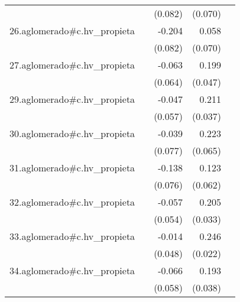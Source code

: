 {\begin{longtable}{l*{4}{D{.}{.}{-1}}}
            &                     &     (0.082)         &     (0.070)         &                     \\
\addlinespace
26.aglomerado#c.hv\_propieta&                     &      -0.204\sym{*}  &       0.058         &                     \\
            &                     &     (0.082)         &     (0.070)         &                     \\
\addlinespace
27.aglomerado#c.hv\_propieta&                     &      -0.063         &       0.199\sym{***}&                     \\
            &                     &     (0.064)         &     (0.047)         &                     \\
\addlinespace
29.aglomerado#c.hv\_propieta&                     &      -0.047         &       0.211\sym{***}&                     \\
            &                     &     (0.057)         &     (0.037)         &                     \\
\addlinespace
30.aglomerado#c.hv\_propieta&                     &      -0.039         &       0.223\sym{***}&                     \\
            &                     &     (0.077)         &     (0.065)         &                     \\
\addlinespace
31.aglomerado#c.hv\_propieta&                     &      -0.138         &       0.123\sym{*}  &                     \\
            &                     &     (0.076)         &     (0.062)         &                     \\
\addlinespace
32.aglomerado#c.hv\_propieta&                     &      -0.057         &       0.205\sym{***}&                     \\
            &                     &     (0.054)         &     (0.033)         &                     \\
\addlinespace
33.aglomerado#c.hv\_propieta&                     &      -0.014         &       0.246\sym{***}&                     \\
            &                     &     (0.048)         &     (0.022)         &                     \\
\addlinespace
34.aglomerado#c.hv\_propieta&                     &      -0.066         &       0.193\sym{***}&                     \\
            &                     &     (0.058)         &     (0.038)         &                     \\

\end{longtable}}
